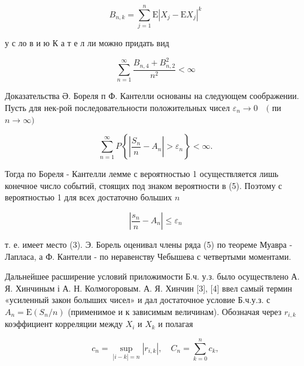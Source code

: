 \documentclass[10pt]{article}
\begin{document}
\[

B_{n, k}=\sum_{j=1}^{n} \mathrm{E}\left|X_{j}-\mathrm{E} X_{j}\right|^{k}

\]



у с ло в и ю К а т е л ли можно придать вид



\[

\sum_{n=1}^{\infty} \frac{B_{n, 4}+B_{n, 2}^{2}}{n^{2}}<\infty

\]



Доказательства Ә. Бореля п Ф. Кантелли основаны на следующем соображении. Пусть для нек-рой последовательности положительных чисел $\varepsilon_{n} \rightarrow 0 \quad($ пи $n \rightarrow \infty)$



\[

\sum_{n=1}^{\infty} P\left\{\left|\frac{S_{n}}{n}-A_{n}\right|>\varepsilon_{n}\right\}<\infty .

\]



Тогда по Бореля - Кантелли лемме с вероятностью 1 осуществляется лишь конечное число событий, стоящих под знаком вероятности в (5). Поэтому с вероятностью 1 для всех достаточно больших $n$



\[

\left|\frac{s_{n}}{n}-A_{n}\right| \leqslant \varepsilon_{n}

\]



т. е. имеет место (3). Э. Борель оценивал члены ряда (5) по теореме Муавра - Лапласа, а Ф. Кантелли - по неравенству Чебышева с четвертыми моментами.



Дальнейшее расширение условий приложимости Б.ч. у.з. было осуществлено А. Я. Хинчиным і А. Н. Колмогоровым. А. Я. Хинчин [3], [4] ввел самый термин «усиленный закон болыших чисел» и дал достаточное условие Б.ч.у.з. с $A_{n}=\mathrm{E}\left(S_{n} / n\right)$ (применимое и к зависимым величинам). Обозначая через $r_{i, k}$ коэффициент корреляции между $X_{i}$ и $X_{k}$ и полагая



\[

c_{n}=\sup _{|i-k|=n}\left|r_{i, k}\right|, \quad C_{n}=\sum_{k=0}^{n} c_{k},

\]
\end{document}
